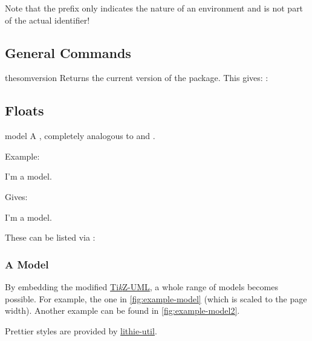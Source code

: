\documentclass{sopra-base}
\begin{document}
Note that the prefix  only indicates the nature of an environment and is not part of the actual identifier!

\subsection{General Commands}

\begin{command}{thesomversion}{}
    Returns the current version of the package. This gives: : \thesomversion\\
\end{command}

\subsection{Floats}

\begin{environment}{model}{}
    A , completely analogous to  and .
\end{environment}

Example:
\begin{plainlatex}[morekeywords={[3]{model}}]
\begin{model}
    \centering
    I'm a model.
    \caption[And I'm actually shorter.]{I am the title.}
\end{model}
\end{plainlatex}
Gives:
\begin{model}
    \centering
    I'm a model.
    \caption[And I'm actually shorter.]{I am the title.}
\end{model}

These can be listed via :

\listofmodel

\subsubsection{A Model}
By embedding the modified \href{https://perso.ensta-paris.fr/~kielbasi/tikzuml/}{Ti\textit{k}Z-UML}, a whole range of models becomes possible. For example, the one in \autoref{fig:example-model} (which is scaled to the page width). Another example can be found in \autoref{fig:example-model2}.

Prettier styles are provided by \href{https://github.com/EagleoutIce/lithie-util}{lithie-util}.
\end{document}
